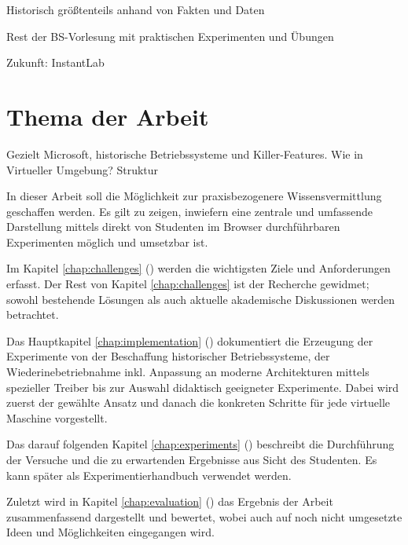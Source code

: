 	Historisch größtenteils anhand von Fakten und Daten

	Rest der BS-Vorlesung mit praktischen Experimenten und Übungen

	Zukunft: InstantLab
		

\section{Thema der Arbeit}
\label{sec:topic}
				
		
		Gezielt Microsoft, historische Betriebssysteme und Killer-Features. 
		Wie in Virtueller Umgebung?
		Struktur


		In dieser Arbeit soll die Möglichkeit zur praxisbezogenere Wissensvermittlung geschaffen werden. Es gilt zu zeigen, inwiefern eine zentrale und umfassende Darstellung mittels direkt von Studenten im Browser durchführbaren Experimenten möglich und umsetzbar ist.
		
		Im Kapitel \ref{chap:challenges} () werden die wichtigsten Ziele und Anforderungen erfasst. 
		Der Rest von Kapitel \ref{chap:challenges} ist der Recherche gewidmet; sowohl bestehende Lösungen als auch aktuelle akademische Diskussionen werden betrachtet.
		
		Das Hauptkapitel \ref{chap:implementation} () dokumentiert die Erzeugung der Experimente von der Beschaffung historischer Betriebssysteme, der Wiederinebetriebnahme inkl. Anpassung an moderne Architekturen mittels spezieller Treiber bis zur Auswahl didaktisch geeigneter Experimente.
		Dabei wird zuerst der gewählte Ansatz und danach die konkreten Schritte für jede virtuelle Maschine vorgestellt.
		
		Das darauf folgenden Kapitel \ref{chap:experiments} () beschreibt die Durchführung der Versuche und die zu erwartenden Ergebnisse aus Sicht des Studenten. Es kann später als Experimentierhandbuch verwendet werden.

		Zuletzt wird in Kapitel \ref{chap:evaluation} () das Ergebnis der Arbeit zusammenfassend dargestellt und bewertet, wobei auch auf noch nicht umgesetzte Ideen und Möglichkeiten eingegangen wird.
		

